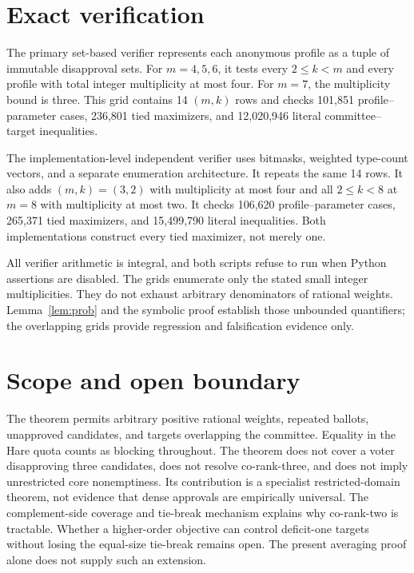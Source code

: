 \documentclass[11pt]{article}
\begin{document}
\section{Exact verification}

The primary set-based verifier represents each anonymous profile as a tuple
of immutable disapproval sets.  For $m=4,5,6$, it tests every $2\le k<m$ and
every profile with total integer multiplicity at most four.  For $m=7$, the
multiplicity bound is three.  This grid contains 14 $(m,k)$ rows and checks
101,851 profile--parameter cases, 236,801 tied maximizers, and 12,020,946
literal committee--target inequalities.

The implementation-level independent verifier uses bitmasks, weighted
type-count vectors, and a separate enumeration architecture.  It repeats the
same 14 rows.  It also adds $(m,k)=(3,2)$ with multiplicity at most four and
all $2\le k<8$ at $m=8$ with multiplicity at most two.  It checks 106,620
profile--parameter cases, 265,371 tied maximizers, and 15,499,790 literal
inequalities.  Both implementations construct every tied maximizer, not
merely one.

All verifier arithmetic is integral, and both scripts refuse to run when
Python assertions are disabled.  The grids enumerate only the stated small
integer multiplicities.  They do not exhaust arbitrary denominators of
rational weights.  Lemma~\ref{lem:prob} and the symbolic proof establish
those unbounded quantifiers; the overlapping grids provide regression and
falsification evidence only.

\section{Scope and open boundary}

The theorem permits arbitrary positive rational weights, repeated ballots,
unapproved candidates, and targets overlapping the committee.  Equality in
the Hare quota counts as blocking throughout.  The theorem does not cover a
voter disapproving three candidates, does not resolve co-rank-three, and does
not imply unrestricted core nonemptiness.  Its contribution is a specialist
restricted-domain theorem, not evidence that dense approvals are empirically
universal.  The complement-side coverage and tie-break mechanism explains
why co-rank-two is tractable.  Whether a higher-order objective can control
deficit-one targets without losing the equal-size tie-break remains open.
The present averaging proof alone does not supply such an extension.
\end{document}

